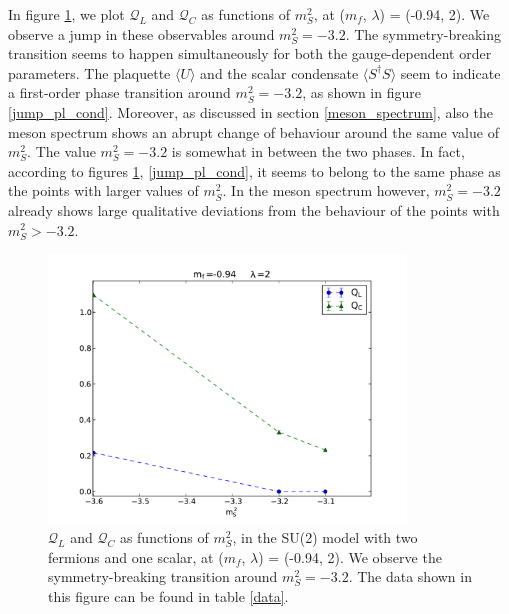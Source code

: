 In figure \ref{jump_Q}, we plot $\mathcal Q_L$ and $\mathcal Q_C$ as functions of $m_S^2$, at ($m_f$, $\lambda$) = (-0.94, 2). We observe a jump in these observables around $m_S^2 = -3.2$. The symmetry-breaking transition seems to happen simultaneously for both the gauge-dependent order parameters. The plaquette $\langle U \rangle$ and the scalar condensate $\langle S^{\dagger} S \rangle$ seem to indicate a first-order phase transition around $m_S^2 = -3.2$, as shown in figure \ref{jump_pl_cond}. Moreover, as discussed in section \ref{meson_spectrum}, also the meson spectrum shows an abrupt change of behaviour around the same value of $m_S^2$. The value $m_S^2 = -3.2$ is somewhat in between the two phases. In fact, according to figures \ref{jump_Q}, \ref{jump_pl_cond}, it seems to belong to the same phase as the points with larger values of $m_S^2$. In the meson spectrum however, $m_S^2 = -3.2$ already shows large qualitative deviations from the behaviour of the points with $m_S^2 > -3.2$.

\begin{figure}[thb] 
\begin{center}
  \includegraphics[width=9.5cm,clip]{pics/jump_Q}  
  \end{center}
  \caption{$\mathcal Q_L$ and $\mathcal Q_C$ as functions of $m_S^2$, in the SU(2) model with two fermions and one scalar, at ($m_f$, $\lambda$) = (-0.94, 2). We observe the symmetry-breaking transition around $m_S^2 = -3.2$. The data shown in this figure can be found in table \ref{data}.}
  \label{jump_Q}
\end{figure}


